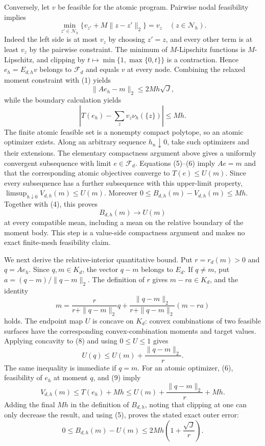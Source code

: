Conversely, let \(v\) be feasible for the atomic program.  Pairwise nodal
feasibility implies
\[
 \min_{z'\in\mathcal N_h}\{v_{z'}+M\|z-z'\|_2\}=v_z
 \quad(z\in\mathcal N_h).
\]
Indeed the left side is at most \(v_z\) by choosing \(z'=z\), and every other
term is at least \(v_z\) by the pairwise constraint.  The minimum of
\(M\)-Lipschitz functions is \(M\)-Lipschitz, and clipping by
\(t\mapsto\min\{1,\max\{0,t\}\}\) is a contraction.  Hence
\(e_h=E_{d,h}v\) belongs to \(\mathcal F_d\) and equals \(v\) at every node.
Combining the relaxed moment constraint with (1) yields
\[
 \|Ae_h-m\|_2\le 2Mh\sqrt J,                                 \tag{5}
\]
while the boundary calculation yields
\[
 \left|T(e_h)-\sum_zv_z\nu_h(\{z\})\right|\le Mh.            \tag{6}
\]
The finite atomic feasible set is a nonempty compact polytope, so an atomic
optimizer exists.  Along an arbitrary sequence \(h_n\downarrow0\), take such
optimizers and their extensions.  The elementary compactness argument above
gives a uniformly convergent subsequence with limit \(e\in\mathcal F_d\).
Equations (5)--(6) imply \(Ae=m\) and that the corresponding atomic objectives
converge to \(T(e)\le U(m)\).  Since every subsequence has a further subsequence
with this upper-limit property,
\(\limsup_{h\downarrow0}V_{d,h}(m)\le U(m)\).  Moreover
\(0\le B_{d,h}(m)-V_{d,h}(m)\le Mh\).  Together with (4), this proves
\[
 B_{d,h}(m)\longrightarrow U(m)                              \tag{7}
\]
at every compatible mean, including a mean on the relative boundary of the
moment body.  This step is a value-side compactness argument and makes no exact
finite-mesh feasibility claim.

We next derive the relative-interior quantitative bound.  Put
\(r=r_d(m)>0\) and \(q=Ae_h\).  Since \(q,m\in K_d\), the vector
\(q-m\) belongs to \(E_d\).  If \(q\ne m\), put
\(a=(q-m)/\|q-m\|_2\).  The definition of \(r\) gives
\(m-ra\in K_d\), and the identity
\[
 m=\frac{r}{r+\|q-m\|_2}q
   +\frac{\|q-m\|_2}{r+\|q-m\|_2}(m-ra)                     \tag{8}
\]
holds.  The endpoint map \(U\) is concave on \(K_d\): convex combinations of
two feasible surfaces have the corresponding convex-combination moments and
target values.  Applying concavity to (8) and using \(0\le U\le1\) gives
\[
 U(q)\le U(m)+\frac{\|q-m\|_2}{r}.                           \tag{9}
\]
The same inequality is immediate if \(q=m\).  For an atomic optimizer,
(6), feasibility of \(e_h\) at moment \(q\), and (9) imply
\[
 V_{d,h}(m)\le T(e_h)+Mh
 \le U(m)+\frac{\|q-m\|_2}{r}+Mh.
\]
Adding the final \(Mh\) in the definition of \(B_{d,h}\), noting that clipping
at one can only decrease the result, and using (5), proves the stated exact
outer error:
\[
 0\le B_{d,h}(m)-U(m)
 \le 2Mh\left(1+\frac{\sqrt J}{r}\right).                   \tag{10}
\]

